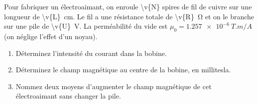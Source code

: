 Pour fabriquer un électroaimant, on enroule \num{\v{N}} spires de fil de cuivre sur une longueur de \qty{\v{L}}{cm}. Le fil a une résistance totale de \qty{\v{R}}{\ohm} et on le branche sur une pile de \qty{\v{U}}{V}. La perméabilité du vide est $\mu_0 = \qty{1.257e-6}{T.m/A}$ (on néglige l'effet d'un noyau).

\begin{enumerate}[label=\alph*)]
    \item Déterminez l'intensité du courant dans la bobine.
    \item Déterminez le champ magnétique au centre de la bobine, en millitesla.
    \item Nommez deux moyens d'augmenter le champ magnétique de cet électroaimant sans changer la pile.
\end{enumerate}

